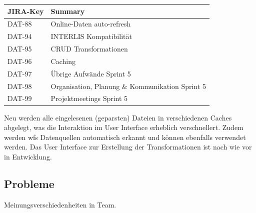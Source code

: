 \begin{table}[H]	
\centering
\begin{tabular}{ll}
	\toprule
	\textbf{JIRA-Key} & \textbf{Summary}\\
	\midrule
DAT-88 & Online-Daten auto-refresh\\
DAT-94 & INTERLIS Kompatibilität\\
DAT-95 & CRUD Transformationen\\
DAT-96 & Caching\\
DAT-97 & Übrige Aufwände Sprint 5\\
DAT-98 & Organisation, Planung \& Kommunikation Sprint 5\\
DAT-99 & Projektmeetings Sprint 5\\
	\bottomrule
\end{tabular}	
\end{table}

Neu werden alle eingelesenen (geparsten) Dateien in verschiedenen Caches abgelegt, was die Interaktion im User Interface erheblich verschnellert. Zudem werden \acs{wfs} Datenquellen automatisch erkannt und können ebenfalls verwendet werden. Das User Interface zur Erstellung der Transformationen ist nach wie vor in Entwicklung.

\subsection{Probleme}
Meinungsverschiedenheiten in Team.
